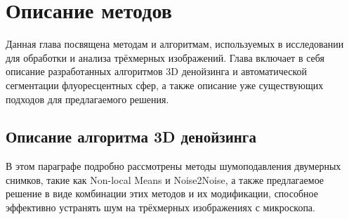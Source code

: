 \chapter{Описание методов} \label{ch2}
Данная глава посвящена методам и алгоритмам, используемых в исследовании для обработки и анализа трёхмерных изображений. Глава включает в себя описание разработанных алгоритмов 3D денойзинга и автоматической сегментации флуоресцентных сфер, а также описание уже существующих подходов для предлагаемого решения. 
\section{Описание алгоритма 3D денойзинга} \label{ch2:sec1}
\par В этом параграфе подробно рассмотрены методы шумоподавления двумерных снимков, такие как Non-local Means и Noise2Noise, а также предлагаемое решение в виде комбинации этих методов и их модификации, способное эффективно устранять шум на трёхмерных изображениях с микроскопа.

